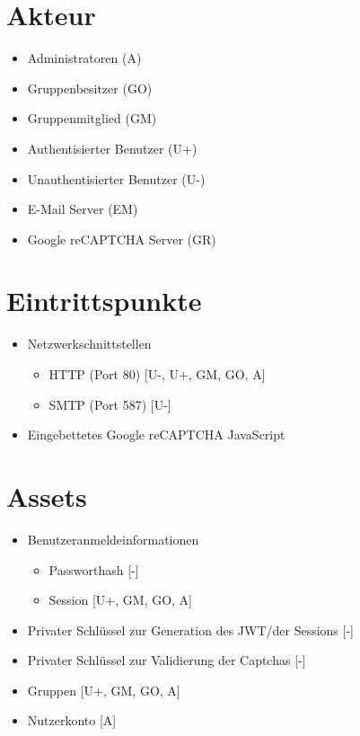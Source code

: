 \documentclass[fontsize=12pt,DIV=14,BCOR=10mm,a4paper,parskip=half-,ngerman,english,bibliography=totocnumbered]{scrreprt}
\begin{document}
\chapter{Akteur}

\begin{itemize}
  \item Administratoren (A)
  \item Gruppenbesitzer (GO)
  \item Gruppenmitglied (GM)
  \item Authentisierter Benutzer (U+)
  \item Unauthentisierter Benutzer (U-)
  \item E-Mail Server (EM)
  \item Google reCAPTCHA Server (GR)
\end{itemize}

\chapter{Eintrittspunkte}

\begin{itemize}
  \item Netzwerkschnittstellen
  \begin{itemize}
    \item HTTP (Port 80)  [U-, U+, GM, GO, A]
    \item SMTP (Port 587) [U-]
  \end{itemize}
  \item Eingebettetes Google reCAPTCHA JavaScript
\end{itemize}

\chapter{Assets}

\begin{itemize}
  \item Benutzeranmeldeinformationen
  \begin{itemize}
    \item Passworthash [-]
    \item Session [U+, GM, GO, A]
  \end{itemize}
  \item Privater Schlüssel zur Generation des JWT/der Sessions [-]
  \item Privater Schlüssel zur Validierung der Captchas [-]
  \item Gruppen [U+, GM, GO, A]
  \item Nutzerkonto [A]
\end{itemize}
\end{document}
